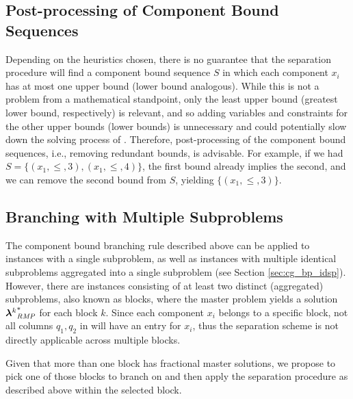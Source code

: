 \subsection{Post-processing of Component Bound Sequences}\label{sec:cmpbnd_separation_postprocessing}
Depending on the heuristics chosen, there is no guarantee that the separation procedure will find a component bound sequence $S$ in which each component $x_i$ has at most one upper bound (lower bound analogous). While this is not a problem from a mathematical standpoint, only the least upper bound (greatest lower bound, respectively) is relevant, and so adding variables and constraints for the other upper bounds (lower bounds) is unnecessary and could potentially slow down the solving process of \SP{}. Therefore, post-processing of the component bound sequences, i.e., removing redundant bounds, is advisable. For example, if we had $S = \{(x_1, \leq, 3), (x_1, \leq, 4)\}$, the first bound already implies the second, and we can remove the second bound from $S$, yielding $\{(x_1, \leq, 3)\}$.

\subsection{Branching with Multiple Subproblems}\label{sec:cmpbnd_separation_branching}
The component bound branching rule described above can be applied to instances with a single subproblem, as well as instances with multiple identical subproblems aggregated into a single subproblem (see Section \ref{sec:cg_bp_idsp}). However, there are instances consisting of at least two distinct (aggregated) subproblems, also known as blocks, where the master problem yields a solution ${{\bm{\lambda}}^k}^*_{\textit{RMP}}{}$ for each block $k$. Since each component $x_i$ belongs to a specific block, not all columns $q_1, q_2$ in \RMP{} will have an entry for $x_i$, thus the separation scheme is not directly applicable across multiple blocks.

Given that more than one block has fractional master solutions, we propose to pick one of those blocks to branch on and then apply the separation procedure as described above within the selected block.
